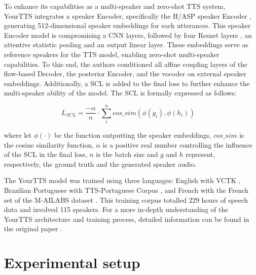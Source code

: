 To enhance its capabilities as a multi-speaker and zero-shot \ac{TTS} system, YourTTS integrates a speaker Encoder, specifically the \ac{H/ASP} speaker Encoder \cite{heo2020clova}, generating 512-dimensional speaker embeddings for each utterances. This speaker Encoder model is compromising a \ac{CNN} layers, followed by four Resnet layers \cite{targ2016resnet}, an attentive statistic pooling and an output linear layer. These embeddings serve as reference speakers for the \ac{TTS} model, enabling zero-shot multi-speaker capabilities. To this end, the authors conditioned all affine coupling layers of the flow-based Decoder, the posterior Encoder, and the vocoder on external speaker embeddings. Additionally, a \ac{SCL} is added to the final loss to further enhance the multi-speaker ability of the model. The \ac{SCL} is formally expressed as follows:

\begin{equation}
    L_{SCL} = \frac{-\alpha}{n} \cdot \sum_{i}^{n} cos\_sim(\phi(g_i), \phi(h_i))
\end{equation}

where let $\phi(\cdot)$ be the function outputting the speaker embeddings, $cos\_sim$ is the cosine similarity function, $\alpha$ is a positive real number controlling the influence of the \ac{SCL} in the final loss, $n$ is the batch size and $g$ and $h$ represent, respectively, the ground truth and the generated speaker audio.

The YourTTS model was trained using three languages: English with VCTK \cite{veaux2016superseded}, Brazilian Portuguese with TTS-Portuguese Corpus \cite{casanova2022tts}, and French with the French set of the M-AILABS dataset \cite{mailabs}. This training corpus totalled 229 hours of speech data and involved 115 speakers. For a more in-depth understanding of the YourTTS architecture and training process, detailed information can be found in the original paper \cite{casanova2022yourtts}.


\section{Experimental setup}
\label{section:methods}


